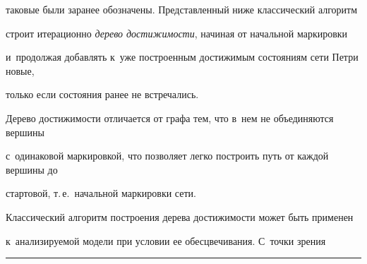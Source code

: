 таковые были заранее обо\-зна\-че\-ны.  Пред\-став\-лен\-ный ниже классический алгоритм 


строит итерационно \textit{дерево достижимости}, начиная от начальной маркировки 


и~продолжая до\-бав\-лять к~уже по\-стро\-ен\-ным до\-сти\-жи\-мым со\-сто\-яни\-ям сети Петри новые, 


только если  со\-сто\-яния ранее не встречались.


Дерево до\-сти\-жи\-мости отличается от графа тем, что в~нем не объединяются вершины 


с~одинаковой маркировкой, что поз\-во\-ля\-ет лег\-ко построить путь от каж\-дой вершины до 


стартовой, т.\,е.\ начальной маркировки сети.











Классический алгоритм построения дерева до\-сти\-жи\-мости может быть применен 


к~ана\-ли\-зи\-ру\-емой модели при условии ее обес\-цве\-чи\-ва\-ния. С~точ\-ки зрения\linebreak\vspace*{-12pt}





\pagebreak










\hrule





\vspace*{6pt}





